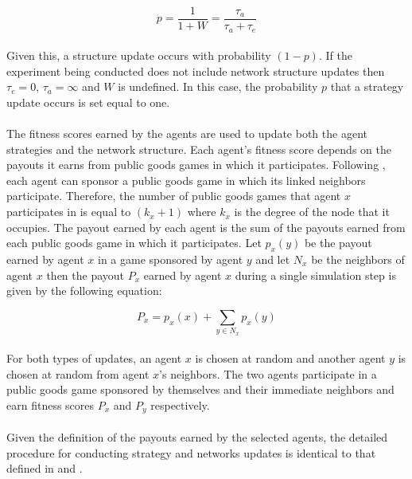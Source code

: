 \documentclass{article}
\begin{document}
	\begin{equation}
	p=\frac{1}{1+W}=\frac{\tau_a}{\tau_a+\tau_e}	
	\end{equation}

	\paragraph{}Given this, a structure update occurs with probability $(1-p)$.  If the experiment being conducted does not include network structure updates then $\tau_e=0$, $\tau_a=\infty$ and $W$ is undefined.  In this case, the probability $p$ that a strategy update occurs is set equal to one.
	\paragraph{}The fitness scores earned by the agents are used to update both the agent strategies and the network structure.  Each agent's fitness score depends on the payouts it earns from public goods games in which it participates.  Following \cite{Li2014}, each agent can sponsor a public goods game in which its linked neighbors participate.  Therefore, the number of public goods games that agent $x$ participates in is equal to $(k_x+1)$ where $k_x$ is the degree of the node that it occupies.  The payout earned by each agent is the sum of the payouts earned from each public goods game in which it participates.  Let $p_x(y)$ be the payout earned by agent $x$ in a game sponsored by agent $y$ and let $N_x$ be the neighbors of agent $x$ then the payout $P_x$ earned by agent $x$ during a single simulation step is given by the following equation:

	\begin{equation}
	P_x=p_x(x)+\sum_{y \in N_x} p_x(y)
	\end{equation}

	\paragraph{}For both types of updates, an agent $x$ is chosen at random and another agent $y$ is chosen at random from agent $x$'s neighbors.  The two agents participate in a public goods game sponsored by themselves and their immediate neighbors and earn fitness scores $P_x$ and $P_y$ respectively.
	\paragraph{}Given the definition of the payouts earned by the selected agents, the detailed procedure for conducting strategy and networks updates is identical to that defined in \cite{Santos2006d} and \cite{Fu2008}.
\end{document}
